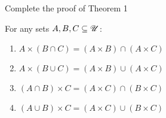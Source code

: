 \documentclass[a4paper, english, 12pt]{article} %
\begin{document}
\newpageanswer


\begin{problem}[9]
  Complete the proof of Theorem 1
\end{problem}

\begin{thm}
  For any sets $A, B, C \subseteq \mathscr{U}$:
  \begin{enumerate}[label = \textnormal{\textbf{\alph*)}}]
    \item $A \times (B \cap C) = (A \times B) \cap (A \times C)$
      \label{item:Theorem1a}
    \item $A \times (B \cup C) = (A \times B) \cup (A \times C)$
      \label{item:Theorem1b}
    \item $(A \cap B) \times C = (A \times C) \cap (B \times C)$
      \label{item:Theorem1c}
    \item $(A \cup B) \times C = (A \times C) \cup (B \times C)$
      \label{item:Theorem1d}
  \end{enumerate}
\end{thm}
\end{document}
